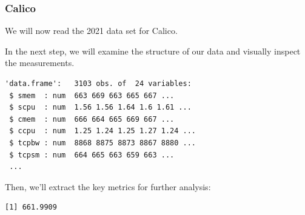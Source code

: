\subsubsection{Calico}

We will now read the 2021 data set for Calico.

\begin{Shaded}
\begin{Highlighting}[]
\OtherTok{\textless{}{-}} 
\OtherTok{\textless{}{-}} \NormalTok{(}\NormalTok{,}\NormalTok{))}
\end{Highlighting}
\end{Shaded}

In the next step, we will examine the structure of our data and visually
inspect the measurements.

\begin{Shaded}
\begin{Highlighting}[]
\end{Highlighting}
\end{Shaded}

\begin{verbatim}
'data.frame':   3103 obs. of  24 variables:
 $ smem  : num  663 669 663 665 667 ...
 $ scpu  : num  1.56 1.56 1.64 1.6 1.61 ...
 $ cmem  : num  666 664 665 669 667 ...
 $ ccpu  : num  1.25 1.24 1.25 1.27 1.24 ...
 $ tcpbw : num  8868 8875 8873 8867 8880 ...
 $ tcpsm : num  664 665 663 659 663 ...
 ...
\end{verbatim}

Then, we'll extract the key metrics for further analysis:

\begin{Shaded}
\begin{Highlighting}[]
\SpecialCharTok{\$}
\end{Highlighting}
\end{Shaded}

\begin{verbatim}
[1] 661.9909
\end{verbatim}

\begin{Shaded}
\begin{Highlighting}[]
\SpecialCharTok{\$}
\end{Highlighting}
\end{Shaded}

